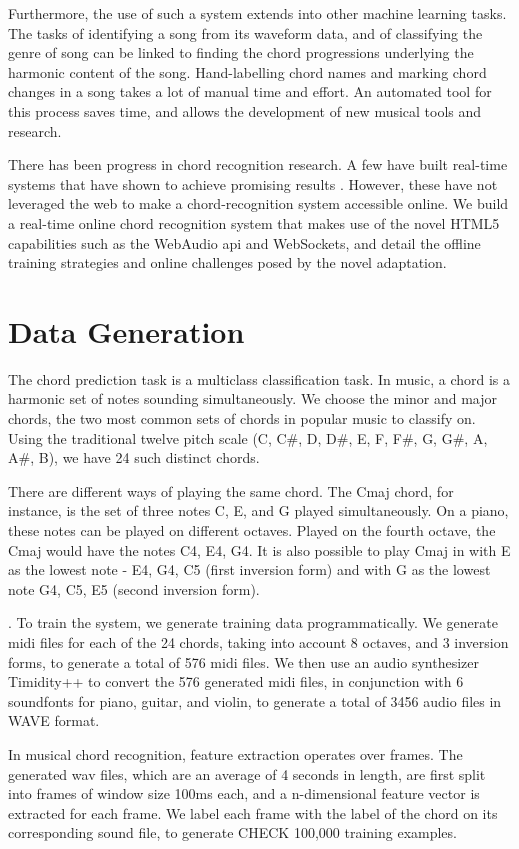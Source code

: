 \documentclass{article}
\begin{document}
Furthermore, the use of such a system extends into other machine learning tasks. The tasks of identifying a song from its waveform data, and of classifying the genre of song can be linked to finding the chord progressions underlying the harmonic content of the song. Hand-labelling chord names and marking chord changes in a song takes a lot of manual time and effort. An automated tool for this process saves time, and allows the development of new musical tools and research.

There has been progress in chord recognition research. A few have built real-time systems that have shown to achieve promising results \cite{fujishima, cho}. However, these have not leveraged the web to make a chord-recognition system accessible online. We build a real-time online chord recognition system that makes use of the novel HTML5 capabilities such as the WebAudio api and WebSockets, and detail the offline training strategies and online challenges posed by the novel adaptation.

\section{Data Generation}
The chord prediction task is a multiclass classification task. In music, a chord is a harmonic set of notes sounding simultaneously. We choose the minor and major chords, the two most common sets of chords in popular music to classify on. Using the traditional twelve pitch scale (C, C\#, D, D\#, E, F, F\#, G, G\#, A, A\#, B), we have 24 such distinct chords.

There are different ways of playing the same chord. The Cmaj chord, for instance, is the set of three notes C, E, and G played simultaneously. On a piano, these notes can be played on different octaves. Played on the fourth octave, the Cmaj would have the notes C4, E4, G4. It is also possible to play Cmaj in with E as the lowest note - E4, G4, C5 (first inversion form) and with G as the lowest note G4, C5, E5 (second inversion form).

\cite{lee}. To train the system, we generate training data programmatically. We generate midi files for each of the 24 chords, taking into account 8 octaves, and 3 inversion forms, to generate a total of 576 midi files. We then use an audio synthesizer Timidity++ to convert the 576 generated midi files, in conjunction with 6 soundfonts for piano, guitar, and violin, to generate a total of 3456 audio files in WAVE format.

In musical chord recognition, feature extraction operates over frames. The generated wav files, which are an average of 4 seconds in length, are first split into frames of window size 100ms each, and a n-dimensional feature vector is extracted for each frame. We label each frame with the label of the chord on its corresponding sound file, to generate CHECK 100,000 training examples.
\end{document}
